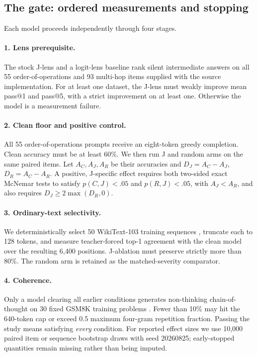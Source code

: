 \documentclass{article}
\newcommand{\jlens}{J-lens}
\begin{document}
\subsection{The gate: ordered measurements and stopping}

Each model proceeds independently through four stages.

\paragraph{1. Lens prerequisite.}
The stock \jlens{} and a logit-lens baseline \citep{nostalgebraist2020logitlens} rank
silent intermediate answers on all 55
order-of-operations and 93 multi-hop items supplied with the source implementation. For at
least one dataset, the \jlens{} must weakly improve mean pass@1 and pass@5, with a strict
improvement on at least one. Otherwise the model is a measurement failure.

\paragraph{2. Clean floor and positive control.}
All 55 order-of-operations prompts receive an eight-token greedy completion. Clean
accuracy must be at least 60\%. We then run J and random arms on the same paired items.
Let $A_C,A_J,A_R$ be their accuracies and $D_J=A_C-A_J$, $D_R=A_C-A_R$. A positive,
J-specific effect requires both two-sided exact McNemar tests \citep{mcnemar1947} to
satisfy $p(C,J)<.05$ and $p(R,J)<.05$, with $A_J<A_R$, and also requires
$D_J\geq2\max(D_R,0)$.

\paragraph{3. Ordinary-text selectivity.}
We deterministically select 50 WikiText-103 training sequences \citep{merity2016wikitext},
truncate each to 128 tokens, and measure teacher-forced top-1 agreement with the clean
model over the resulting 6,400 positions. J-ablation must preserve strictly more than
80\%. The random arm is retained as the matched-severity comparator.

\paragraph{4. Coherence.}
Only a model clearing all earlier conditions generates non-thinking chain-of-thought on 30
fixed GSM8K training problems \citep{cobbe2021gsm8k}. Fewer than 10\% may hit the
640-token cap or exceed 0.5 maximum four-gram repetition fraction. Passing the study means
satisfying \emph{every} condition. For reported effect sizes we use 10,000 paired item or
sequence bootstrap draws with seed 20260825; early-stopped quantities remain missing
rather than being imputed.
\end{document}
